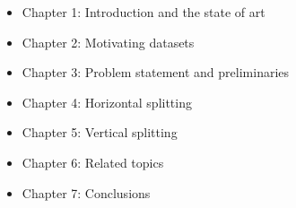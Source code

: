 \documentclass[14pt]{article}
\begin{document}
\begin{itemize}
\item Chapter 1: Introduction and the state of art
\item Chapter 2: Motivating datasets
\item Chapter 3: Problem statement and preliminaries
\item Chapter 4: Horizontal splitting
\item Chapter 5: Vertical splitting
\item Chapter 6: Related topics
\item Chapter 7: Conclusions
\end{itemize}


 

{}

\end{document}
